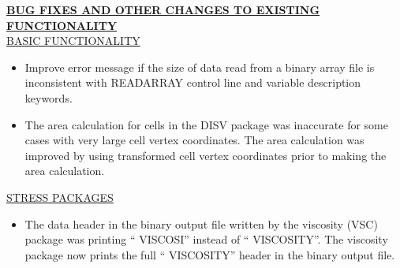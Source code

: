 	
	\item \currentmodflowversion



	\textbf{\underline{BUG FIXES AND OTHER CHANGES TO EXISTING FUNCTIONALITY}} \\
	\underline{BASIC FUNCTIONALITY}
	\begin{itemize}
		\item Improve error message if the size of data read from a binary array file is inconsistent with READARRAY control line and variable description keywords.
		\item The area calculation for cells in the DISV package was inaccurate for some cases with very large cell vertex coordinates.  The area calculation was improved by using transformed cell vertex coordinates prior to making the area calculation.
	\end{itemize}


	\underline{STRESS PACKAGES}
	\begin{itemize}
		\item The data header in the binary output file written by the viscosity (VSC) package was printing `` VISCOSI'' instead of `` VISCOSITY''. The viscosity package now prints the full `` VISCOSITY'' header in the binary output file.
	\end{itemize}


